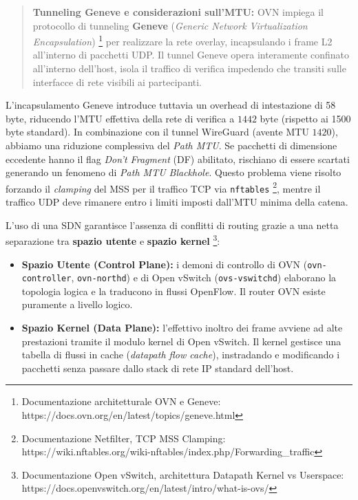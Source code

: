 \begin{quote}
\textbf{Tunneling Geneve e considerazioni sull'MTU:} OVN impiega il
protocollo di tunneling \textbf{Geneve} (\emph{Generic Network
Virtualization Encapsulation}) \footnote{\label{fn:ref_17}Documentazione architetturale
  OVN e Geneve: https://docs.ovn.org/en/latest/topics/geneve.html} per
realizzare la rete overlay, incapsulando i frame L2 all'interno di
pacchetti UDP. Il tunnel Geneve opera interamente confinato all'interno
dell'host, isola il traffico di verifica impedendo che transiti sulle
interfacce di rete visibili ai partecipanti.
\end{quote}

L'incapsulamento Geneve introduce tuttavia un overhead di intestazione
di 58 byte, riducendo l'MTU effettiva della rete di verifica a \(1442\)
byte (rispetto ai 1500 byte standard). In combinazione con il tunnel
WireGuard (avente MTU \(1420\)), abbiamo una riduzione complessiva del
\emph{Path MTU}. Se pacchetti di dimensione eccedente hanno il flag
\emph{Don't Fragment} (DF) abilitato, rischiano di essere scartati
generando un fenomeno di \emph{Path MTU Blackhole}. Questo problema
viene risolto forzando il \emph{clamping} del MSS per il traffico TCP
via \passthrough{\lstinline!nftables!} \footnote{\label{fn:ref_18}Documentazione
  Netfilter, TCP MSS Clamping:
  https://wiki.nftables.org/wiki-nftables/index.php/Forwarding\_traffic},
mentre il traffico UDP deve rimanere entro i limiti imposti dall'MTU
minima della catena.

L'uso di una SDN garantisce l'assenza di conflitti di routing grazie a
una netta separazione tra \textbf{spazio utente} e \textbf{spazio
kernel} \footnote{\label{fn:ref_19}Documentazione Open vSwitch, architettura Datapath
  Kernel vs Userspace:
  https://docs.openvswitch.org/en/latest/intro/what-is-ovs/}:

\begin{itemize}
\tightlist
\item
  \textbf{Spazio Utente (Control Plane):} i demoni di controllo di OVN
  (\passthrough{\lstinline!ovn-controller!},
  \passthrough{\lstinline!ovn-northd!}) e di Open vSwitch
  (\passthrough{\lstinline!ovs-vswitchd!}) elaborano la topologia logica
  e la traducono in flussi OpenFlow. Il router OVN esiste puramente a
  livello logico.
\item
  \textbf{Spazio Kernel (Data Plane):} l'effettivo inoltro dei frame
  avviene ad alte prestazioni tramite il modulo kernel di Open vSwitch.
  Il kernel gestisce una tabella di flussi in cache (\emph{datapath flow
  cache}), instradando e modificando i pacchetti senza passare dallo
  stack di rete IP standard dell'host.
\end{itemize}

